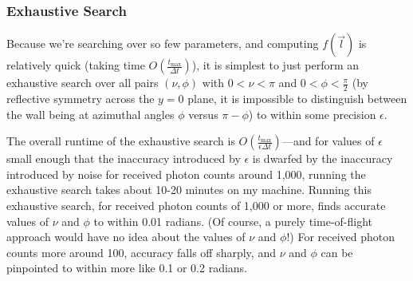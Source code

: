\documentclass[11pt]{article}
\begin{document}
\subsubsection{Exhaustive Search}

Because we're searching over so few parameters, and computing $f(\vec{l})$ is relatively quick (taking time $O(\frac{t_{\mathrm{max}}}{\Delta t})$), it is simplest to just perform an exhaustive search over all pairs $(\nu, \phi)$ with $0 < \nu < \pi$ and $0 < \phi < \frac{\pi}{2}$ (by reflective symmetry across the $y=0$ plane, it is impossible to distinguish between the wall being at azimuthal angles $\phi$ versus $\pi - \phi$) to within some precision $\epsilon$.

The overall runtime of the exhaustive search is $O(\frac{t_{\mathrm{max}}}{\epsilon \Delta t})$---and for values of $\epsilon$ small enough that the inaccuracy introduced by $\epsilon$ is dwarfed by the inaccuracy introduced by noise for received photon counts around 1,000, running the exhaustive search takes about 10-20 minutes on my machine. Running this exhaustive search, for received photon counts of 1,000 or more, finds accurate values of $\nu$ and $\phi$ to within 0.01 radians. (Of course, a purely time-of-flight approach would have no idea about the values of $\nu$ and $\phi$!) For received photon counts more around 100, accuracy falls off sharply, and $\nu$ and $\phi$ can be pinpointed to within more like 0.1 or 0.2 radians.
\end{document}
